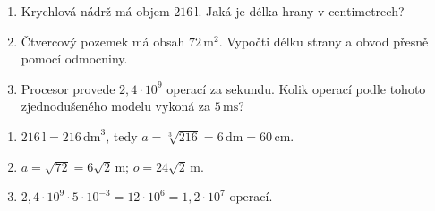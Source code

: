 \documentclass[11pt,a4paper]{article}
\begin{document}
\begin{zadaniReseniBox}[title={Domácí úkol},breakable=false]
\begin{enumerate}[label=\alph*)]
\item Krychlová nádrž má objem $216\,\mathrm l$. Jaká je délka hrany v centimetrech?
\item Čtvercový pozemek má obsah $72\,\mathrm{m}^2$. Vypočti délku strany a
obvod přesně pomocí odmocniny.
\item Procesor provede $2{,}4\cdot10^9$ operací za sekundu.
Kolik operací podle tohoto zjednodušeného modelu vykoná za $5\,\mathrm{ms}$?
\end{enumerate}
\tcblower
\begin{enumerate}[label=\alph*)]
\item $216\,\mathrm l=216\,\mathrm{dm}^3$, tedy $a=\sqrt[3]{216}=6\,\mathrm{dm}=60\,\mathrm{cm}$.
\item $a=\sqrt{72}=6\sqrt2\,\mathrm m$;
$o=24\sqrt2\,\mathrm m$.
\item $2{,}4\cdot10^9\cdot5\cdot10^{-3}=12\cdot10^6=1{,}2\cdot10^7$ operací.
\end{enumerate}
\end{zadaniReseniBox}

\end{document}
